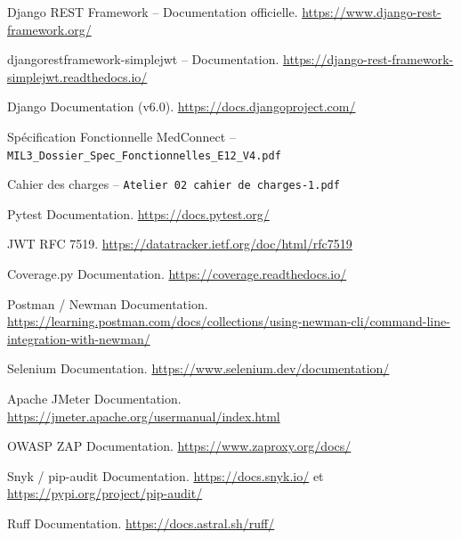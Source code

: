 \documentclass[12pt,a4paper]{report}
\begin{document}
\begin{enumerate}[leftmargin=*, label={[R\arabic*]}]
  \item Django REST Framework -- Documentation officielle. \url{https://www.django-rest-framework.org/}
  \item djangorestframework-simplejwt -- Documentation. \url{https://django-rest-framework-simplejwt.readthedocs.io/}
  \item Django Documentation (v6.0). \url{https://docs.djangoproject.com/}
  \item Spécification Fonctionnelle MedConnect -- \texttt{MIL3\_Dossier\_Spec\_Fonctionnelles\_E12\_V4.pdf}
  \item Cahier des charges -- \texttt{Atelier 02 cahier de charges-1.pdf}
  \item Pytest Documentation. \url{https://docs.pytest.org/}
  \item JWT RFC 7519. \url{https://datatracker.ietf.org/doc/html/rfc7519}
  \item Coverage.py Documentation. \url{https://coverage.readthedocs.io/}
  \item Postman / Newman Documentation. \url{https://learning.postman.com/docs/collections/using-newman-cli/command-line-integration-with-newman/}
  \item Selenium Documentation. \url{https://www.selenium.dev/documentation/}
  \item Apache JMeter Documentation. \url{https://jmeter.apache.org/usermanual/index.html}
  \item OWASP ZAP Documentation. \url{https://www.zaproxy.org/docs/}
  \item Snyk / pip-audit Documentation. \url{https://docs.snyk.io/} et \url{https://pypi.org/project/pip-audit/}
  \item Ruff Documentation. \url{https://docs.astral.sh/ruff/}
\end{enumerate}
\end{document}
